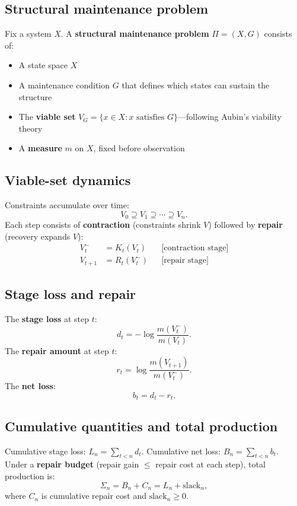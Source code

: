 \documentclass[11pt,a4paper]{article}
\begin{document}
\subsection{Structural maintenance problem}

Fix a system $X$. A \textbf{structural maintenance problem} $\Pi=(X,G)$ consists of:
\begin{itemize}
\item A state space $X$
\item A maintenance condition $G$ that defines which states can sustain the structure
\item The \textbf{viable set} $V_G=\{x\in X : x\text{ satisfies }G\}$---following Aubin's viability theory~\cite{aubin1991}
\item A \textbf{measure} $m$ on $X$, fixed before observation
\end{itemize}

\subsection{Viable-set dynamics}

Constraints accumulate over time:
\[
V_0 \supseteq V_1 \supseteq \cdots \supseteq V_n.
\]
Each step consists of \textbf{contraction} (constraints shrink $V$) followed by \textbf{repair} (recovery expands $V$):
\begin{align}
V_t^- &= K_t(V_t) && \text{[contraction stage]} \\
V_{t+1} &= R_t(V_t^-) && \text{[repair stage]}
\end{align}

\subsection{Stage loss and repair}

The \textbf{stage loss} at step $t$:
\[
d_t = -\log\frac{m(V_t^-)}{m(V_t)}.
\]
The \textbf{repair amount} at step $t$:
\[
r_t = \log\frac{m(V_{t+1})}{m(V_t^-)}.
\]
The \textbf{net loss}:
\[
b_t = d_t - r_t.
\]

\subsection{Cumulative quantities and total production}

Cumulative stage loss: $L_n=\sum_{t<n}d_t$. Cumulative net loss: $B_n=\sum_{t<n}b_t$. Under a \textbf{repair budget} (repair gain $\leq$ repair cost at each step), total production is:
\[
\Sigma_n = B_n + C_n = L_n + \mathrm{slack}_n,
\]
where $C_n$ is cumulative repair cost and $\mathrm{slack}_n\geq 0$.
\end{document}

